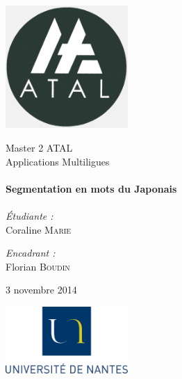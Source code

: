 
\begin{titlepage}
	\begin{center}

		\includegraphics[width=0.35\textwidth]{Figures/ATAL.png}~

		\LARGE{Master 2 \textsc{ATAL}}\\[1.5cm]

		\Large{Applications Multiligues}\\[0.5cm]

		\HRule \\[0.4cm]
		{ \huge \bfseries Segmentation en mots du Japonais \\[0.4cm] }
		\HRule \\[1.5cm]

		\normalsize		
		\emph{\'Etudiante :}\\
		Coraline \textsc{Marie}

		\vspace{0.5cm}

		\emph{Encadrant :} \\
		Florian \textsc{Boudin}

		\vspace{1cm}

		{\large 3 novembre 2014}

		\vfill

		
		\includegraphics[width=0.35\textwidth]{Figures/logoUN.png}~\\[2cm]

	\end{center}
\end{titlepage}

